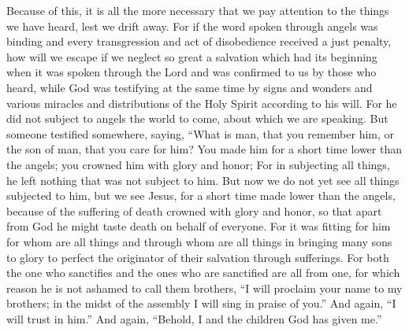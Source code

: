 \begin{biblechapter} %
 Because of this, it is all the more necessary that we pay attention to the things we have heard, lest we drift away.
\verse For if the word spoken through angels was binding and every transgression and act of disobedience received a just penalty,
\verse how will we escape if we neglect so great a salvation which had its beginning when it was spoken through the Lord and was confirmed to us by those who heard,
\verse while God was testifying at the same time by signs and wonders and various miracles and distributions of the Holy Spirit according to his will.
 For he did not subject to angels the world to come, about which we are speaking.
\verse But someone testified somewhere, saying,
\verse “What is man, that you remember him, 
or the son of man, that you care for him?
\verse You made him for a short time lower than the angels; 
you crowned him with glory and honor;
\verse For in subjecting all things, he left nothing that was not subject to him. But now we do not yet see all things subjected to him,
\verse but we see Jesus, for a short time made lower than the angels, because of the suffering of death crowned with glory and honor, so that apart from God he might taste death on behalf of everyone.
\verse For it was fitting for him for whom are all things and through whom are all things in bringing many sons to glory to perfect the originator of their salvation through sufferings.
\verse For both the one who sanctifies and the ones who are sanctified are all from one, for which reason he is not ashamed to call them brothers, “I will proclaim your name to my brothers; 
in the midst of the assembly I will sing in praise of you.”
\verse And again, “I will trust in him.” And again, “Behold, I and the children God has given me.”

\end{biblechapter}
